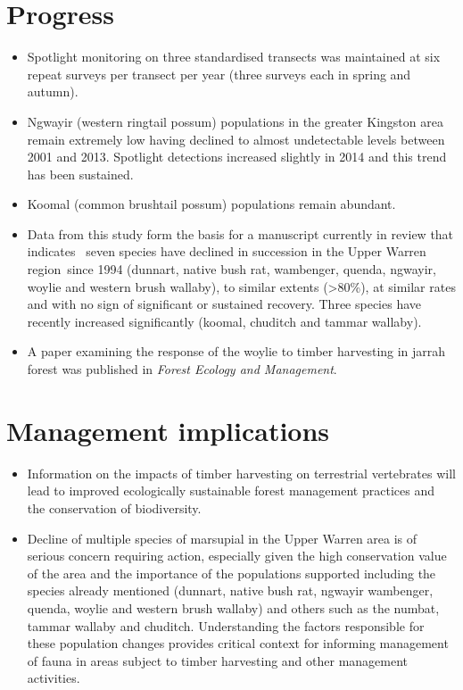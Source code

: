\documentclass[version=last,
    paper=a4, %
    10pt, %
    usenames,
    dvipsnames,
    oneside, %
    headings=openany, %
    DIV=15 %
]{scrbook}
\begin{document}
\section*{Progress}
\begin{itemize}
\itemsep1pt\parskip0pt
\item
  Spotlight monitoring on three standardised transects was maintained at
  six repeat surveys per transect per year (three surveys each in spring
  and autumn).
\item
  Ngwayir (western ringtail possum) populations in the greater Kingston
  area remain extremely low having declined to almost undetectable
  levels between 2001 and 2013. Spotlight detections increased slightly
  in 2014 and this trend has been sustained.
\item
  Koomal (common brushtail possum) populations remain abundant.
\item
  Data from this study form the basis for a manuscript currently in
  review that indicates~ seven species have declined in succession in
  the Upper Warren region~since 1994 (dunnart, native bush rat,
  wambenger, quenda, ngwayir, woylie and western brush wallaby), to
  similar extents (\textgreater{}80\%), at similar rates and with no
  sign of significant or sustained recovery. Three species have recently
  increased significantly (koomal, chuditch and tammar wallaby).
\item
  A paper examining the response of the woylie to timber harvesting in
  jarrah forest was published in \emph{Forest Ecology and Management}.
\end{itemize}



\section*{Management implications}
\begin{itemize}
\itemsep1pt\parskip0pt
\item
  Information on the impacts of timber harvesting on terrestrial
  vertebrates will lead to improved ecologically sustainable forest
  management practices and the conservation of biodiversity.
\item
  Decline of multiple species of marsupial in the Upper Warren area is
  of serious concern requiring action, especially given the high
  conservation value of the area and the importance of the populations
  supported including the species already mentioned (dunnart, native
  bush rat, ngwayir wambenger, quenda, woylie and western brush wallaby)
  and others such as the numbat, tammar wallaby and chuditch.
  Understanding the factors responsible for these population changes
  provides critical context for informing management of fauna in areas
  subject to timber harvesting and other management activities.
\end{itemize}
\end{document}
